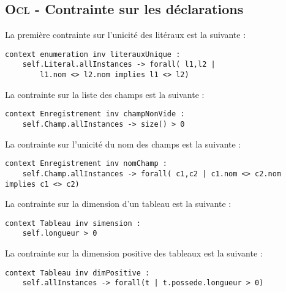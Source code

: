 
\subsection{\textsc{Ocl} - Contrainte sur les déclarations}
\label{sec:question15}

La première contrainte sur l'unicité des litéraux est la suivante :

\begin{lstlisting}[caption=unicité des litéraux,captionpos=b,label={lst:lit_unique},language=OCL]
context enumeration inv literauxUnique :
	self.Literal.allInstances -> forall( l1,l2 | 
		l1.nom <> l2.nom implies l1 <> l2)
\end{lstlisting}

La contrainte sur la liste des champs est la suivante :

\begin{lstlisting}[caption=champ non vide,captionpos=b,label={lst:champ},language=OCL]
context Enregistrement inv champNonVide :
	self.Champ.allInstances -> size() > 0
\end{lstlisting}

La contrainte sur l'unicité du nom des champs est la suivante :

\begin{lstlisting}[caption=Nom unique des champs,captionpos=b,label={lst:champ_unique},language=OCL]
context Enregistrement inv nomChamp :
	self.Champ.allInstances -> forall( c1,c2 | c1.nom <> c2.nom implies c1 <> c2)
\end{lstlisting}

La contrainte sur la dimension d'un tableau est la suivante :

\begin{lstlisting}[caption=dimension d'un tableau,captionpos=b,label={lst:dim_tableau},language=OCL]
context Tableau inv simension :
	self.longueur > 0
\end{lstlisting}

La contrainte sur la dimension positive des tableaux est la suivante :

\begin{lstlisting}[caption=Dimension positive,captionpos=b,label={lst:dim_positive},language=OCL]
context Tableau inv dimPositive :
	self.allInstances -> forall(t | t.possede.longueur > 0)
\end{lstlisting}